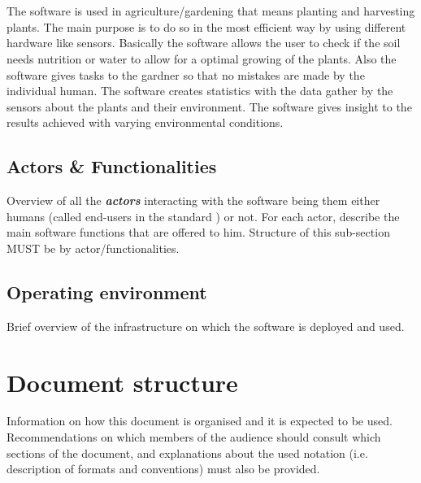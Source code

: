 \section{\mysystemname}

The software is used in agriculture/gardening that means planting and harvesting
plants. The main purpose is to do so in the most efficient way by using
different hardware like sensors. Basically the software allows the user to check
if the soil needs nutrition or water to allow for a optimal growing of the
plants. Also the software gives tasks to the gardner so that no mistakes are
made by the individual human. The software creates statistics with the data
gather by the sensors about the plants and their environment. The software gives
insight to the results achieved with varying environmental conditions.


\subsection{Actors \& Functionalities}
Overview of all the \textbf{\emph{\glspl{actor}}} interacting with the software
being them either humans (called end-users in the standard
\cite{IEEE-2001-userdocumentation}) or not. For each actor, describe the main
software functions that are offered to him. Structure of this sub-section MUST
be by actor/functionalities.


\subsection{Operating environment}
Brief overview of the infrastructure on which the software is deployed and used.

\section{Document structure}  
Information on how this document is organised and it is expected to be
used. Recommendations on which members of the audience
should consult which sections of the document, and explanations about the used
notation (i.e. description of formats and conventions) must also be provided.

